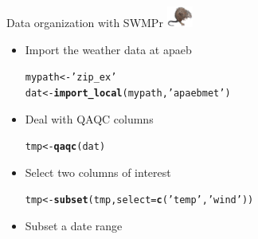 \documentclass[xcolor=dvipsnames,serif]{beamer}\usepackage[]{graphicx}\usepackage[]{color}
\makeatletter
\newcommand{\hlstr}[1]{\textcolor[rgb]{0.192,0.494,0.8}{#1}}%
\newcommand{\hlstd}[1]{\textcolor[rgb]{0.345,0.345,0.345}{#1}}%
\newcommand{\hlkwb}[1]{\textcolor[rgb]{0.69,0.353,0.396}{#1}}%
\newcommand{\hlkwc}[1]{\textcolor[rgb]{0.333,0.667,0.333}{#1}}%
\newcommand{\hlkwd}[1]{\textcolor[rgb]{0.737,0.353,0.396}{\textbf{#1}}}%
\newenvironment{kframe}{%
 \def\at@end@of@kframe{}%
 \ifinner\ifhmode%
  \def\at@end@of@kframe{\end{minipage}}%
  \begin{minipage}{\columnwidth}%
 \fi\fi%
 \def\FrameCommand##1{\hskip\@totalleftmargin \hskip-\fboxsep
 \colorbox{shadecolor}{##1}\hskip-\fboxsep
     \hskip-\linewidth \hskip-\@totalleftmargin \hskip\columnwidth}%
 \MakeFramed {\advance\hsize-\width
   \@totalleftmargin\z@ \linewidth\hsize
   \@setminipage}}%
 {\par\unskip\endMakeFramed%
 \at@end@of@kframe}
\newenvironment{knitrout}{}{} %
\makeatother
\begin{document}
\begin{frame}[fragile]{Data organization with SWMPr \includegraphics[width = 0.065\textwidth]{imgs/swmprat.png}}
\begin{itemize}
\item {}
Import the weather data at apaeb
\begin{knitrout}\scriptsize
{}\color{fgcolor}\begin{kframe}
\begin{alltt}
\hlstd{mypath} \hlkwb{<-} \hlstr{'zip_ex'}
\hlstd{dat} \hlkwb{<-} \hlkwd{import_local}\hlstd{(mypath,} \hlstr{'apaebmet'}\hlstd{)}
\end{alltt}
\end{kframe}
\end{knitrout}
\vspace{0.1in}
\item {}
Deal with QAQC columns
\begin{knitrout}\scriptsize
{}\color{fgcolor}\begin{kframe}
\begin{alltt}
\hlstd{tmp} \hlkwb{<-} \hlkwd{qaqc}\hlstd{(dat)}
\end{alltt}
\end{kframe}
\end{knitrout}
\vspace{0.1in}
\item {}
Select two columns of interest
\begin{knitrout}\scriptsize
{}\color{fgcolor}\begin{kframe}
\begin{alltt}
\hlstd{tmp} \hlkwb{<-} \hlkwd{subset}\hlstd{(tmp,} \hlkwc{select} \hlstd{=} \hlkwd{c}\hlstd{(}\hlstr{'temp'}\hlstd{,} \hlstr{'wind'}\hlstd{))}
\end{alltt}
\end{kframe}
\end{knitrout}
\vspace{0.1in}
\item {}
Subset a date range
\begin{knitrout}\scriptsize
{}\color{fgcolor}\begin{kframe}

\end{kframe}
\end{knitrout}
\end{itemize}
\end{frame}
\end{document}
